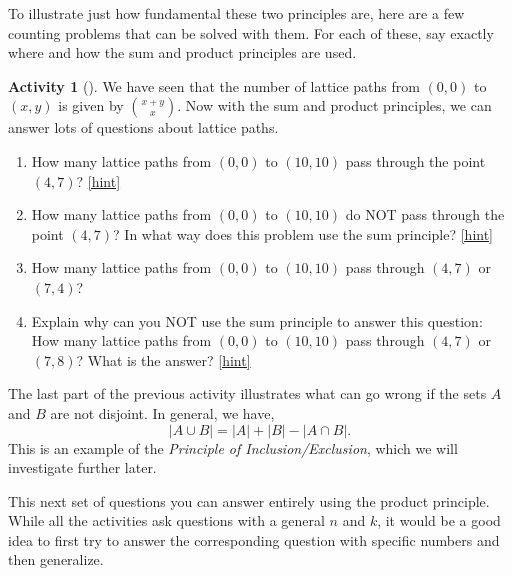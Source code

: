 \documentclass[10pt,]{book}
\theoremstyle{plain}
\theoremstyle{definition}
\theoremstyle{definition}
\theoremstyle{definition}
\newtheorem{activity}[project]{Activity}
\numberwithin{equation}{chapter}
\newcommand{\card}[1]{\left| #1 \right|}
\begin{document}
\hypertarget{p-623}{}%
To illustrate just how fundamental these two principles are, here are a few counting problems that can be solved with them.  For each of these, say exactly where and how the sum and product principles are used.%
\begin{activity}[]\label{act-latticepaths2}
\hypertarget{p-624}{}%
We have seen that the number of lattice paths from \((0,0)\) to \((x,y)\) is given by \(\binom{x+y}{x}\).  Now with the sum and product principles, we can answer lots of questions about lattice paths.%
\begin{enumerate}[font=\bfseries,label=(\alph*),ref=\alph*]
\item\label{task-127} \hypertarget{p-625}{}%
How many lattice paths from \((0,0)\) to \((10,10)\) pass through the point \((4,7)\)?%
\hfill{\tiny\hyperlink{a-85.a}{[hint]}\hypertarget{q-85.a}{}}\item\label{task-128} \hypertarget{p-627}{}%
How many lattice paths from \((0,0)\) to \((10,10)\) do NOT pass through the point \((4,7)\)?  In what way does this problem use the sum principle?%
\hfill{\tiny\hyperlink{a-85.b}{[hint]}\hypertarget{q-85.b}{}}\item\label{task-129} \hypertarget{p-629}{}%
How many lattice paths from \((0,0)\) to \((10,10)\) pass through \((4,7)\) or \((7,4)\)?%
\item\label{task-130} \hypertarget{p-630}{}%
Explain why can you NOT use the sum principle to answer this question: How many lattice paths from \((0,0)\) to \((10,10)\) pass through \((4,7)\) or \((7,8)\)?  What is the answer?%
\hfill{\tiny\hyperlink{a-85.d}{[hint]}\hypertarget{q-85.d}{}}\end{enumerate}
\end{activity}
\hypertarget{p-632}{}%
The last part of the previous activity illustrates what can go wrong if the sets \(A\) and \(B\) are not disjoint.  In general, we have,%
\begin{equation*}
\card{A \cup B} = \card{A} + \card{B} - \card{A \cap B}.
\end{equation*}
This is an example of the \emph{Principle of Inclusion/Exclusion}, which we will investigate further later.%
\par
\hypertarget{p-633}{}%
This next set of questions you can answer entirely using the product principle.  While all the activities ask questions with a general \(n\) and \(k\), it would be a good idea to first try to answer the corresponding question with specific numbers and then generalize.%
\end{document}
